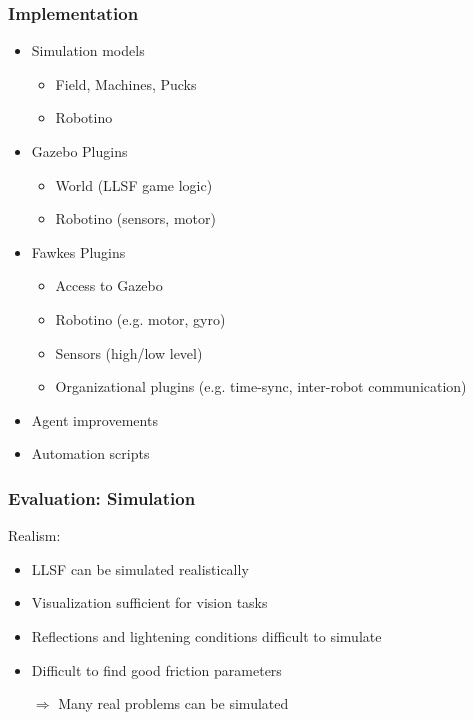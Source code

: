 \documentclass[]{beamer}
\begin{document}
\begin{frame}
  \frametitle{Implementation}
    \begin{itemize}
    \item Simulation models
      \begin{itemize}
      \item Field, Machines, Pucks
      \item Robotino
      \end{itemize}
    \item Gazebo Plugins
      \begin{itemize}
      \item World (LLSF game logic)
      \item Robotino (sensors, motor)
      \end{itemize}
    \item Fawkes Plugins
      \begin{itemize}
      \item Access to Gazebo
      \item Robotino (e.g. motor, gyro) 
      \item Sensors (high/low level)
      \item Organizational plugins (e.g. time-sync, inter-robot communication) %
      \end{itemize}
    \item Agent improvements
    \item Automation scripts
    \end{itemize}
\end{frame}

\begin{frame}
  \frametitle{Evaluation: Simulation}
  Realism:\\
  \begin{itemize}
  \item LLSF can be simulated realistically
  \item Visualization sufficient for vision tasks %
  \item Reflections and lightening conditions difficult to simulate %
  \item Difficult to find good friction parameters
  \item[$\Rightarrow$] Many real problems can be simulated
  \end{itemize}
\end{frame}
\end{document}
